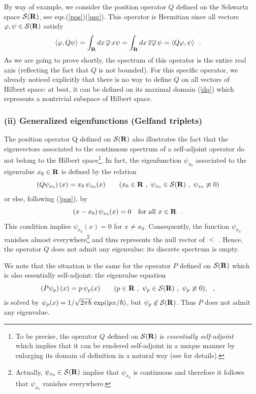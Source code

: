 \documentclass[a4wide,12pt]{report}
\begin{document}
By way of example, we consider the position operator 
$Q$ defined on the Schwartz space ${\cal S}({\bf R})$, see 
eqs.(\ref{pos})(\ref{qsc}). 
This operator is Hermitian since all vectors 
$\varphi, \psi \in {\cal S}({\bf R})$ satisfy
\[
\langle \varphi , Q \psi \rangle 
= \int_{{\bf R}} dx \, \overline{\varphi} \, x \psi 
= \int_{{\bf R}} dx \, \overline{x \varphi} \, \psi 
= \langle Q \varphi ,  \psi \rangle
\ \ . 
\]
As we are going to prove shortly, the spectrum of 
this operator is the entire real axis (reflecting the fact that 
$Q$ is not bounded). 
For this specific operator, we already noticed  
explicitly that there is no way to define $Q$  
on all vectors of Hilbert space: at best, it can be defined 
on its maximal domain (\ref{dq})
which represents a nontrivial subspace of Hilbert space. 


 
 
\subsubsection{(ii) Generalized eigenfunctions (Gelfand triplets)}
 
The position operator Q defined on ${\cal S}({\bf R})$ also illustrates
the fact that the eigenvectors associated to the continuous spectrum  
of a self-adjoint operator do not belong to the Hilbert 
space\footnote{To be precise, the operator $Q$ 
defined on ${\cal S}({\bf R})$ is {\it essentially self-adjoint}
which implies that it can be rendered self-adjoint in a unique manner 
by enlarging its domain of definition in a natural way 
(see \cite{rs, sg} for details).}.
In fact, the eigenfunction $\psi_{x_0}$ associated to the 
eigenvalue $x_0 \in {\bf R}$ is defined by the 
relation
\begin{equation}
\label{vpq}
\left( Q \psi_{x_0} \right) (x) = x_0 \, \psi_{x_0} (x)
\qquad (x_0 \in {\bf R} \ ,  \ \psi_{x_0} \in {\cal S}({\bf R}) \ , \
\psi_{x_0} \not \equiv 0 )
\end{equation}
or else, following (\ref{pos}), by 
\[
(x-x_0) \, \psi_{x_0} (x) = 0
\quad  \mbox{for all  $x\in {\bf R}$}
\ \ .
\]
 This condition implies 
$\psi_{x_0} (x) =0$ for $x \neq x_0$. 
Consequently, the function $\psi_{x_0}$ vanishes almost 
everywhere\footnote{Actually, $\psi_{x_0} \in {\cal S}({\bf R})$
implies that $\psi_{x_0}$ is continuous and therefore 
it follows that $\psi_{x_0}$ vanishes everywhere.} 
and thus represents the null vector of 
$\lt$ \cite{sg, af, rs}. 
 Hence, the operator $Q$ does not admit any eigenvalue:
its discrete spectrum is empty. 

We note that the situation is the same for the operator $P$
defined on ${\cal S}({\bf R})$ which is also essentially self-adjoint: 
the eigenvalue equation 
\[
\left( P\psi_p \right) (x) = p \, \psi_p (x)
\qquad ( p \in {\bf R} \ , \ \psi_p \in {\cal S}({\bf R}) \ , \
\psi_p \not \equiv 0 ),
\ \ ,
\]
is solved by $\psi_p (x) = 1/\sqrt{2\pi \hbar}
\  {\rm exp} ({\rm i} px / \hbar )$, but 
$\psi_p \not \in {\cal S}({\bf R})$.
Thus $P$ does not admit any eigenvalue. 
\end{document}
